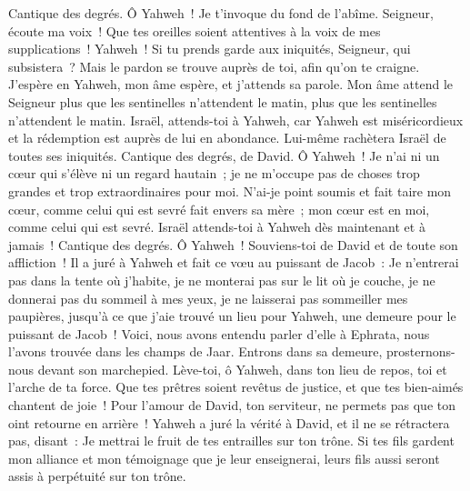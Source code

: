 \begin{multicols}{2}
\VerseOne{}Cantique des degrés. Ô Yahweh~! Je t'invoque du fond de l'abîme.
Seigneur, écoute ma voix~! Que tes oreilles soient attentives à la voix de mes supplications~!
Yahweh~! Si tu prends garde aux iniquités, Seigneur, qui subsistera~?
Mais le pardon se trouve auprès de toi, afin qu'on te craigne.
J'espère en Yahweh, mon âme espère, et j'attends sa parole.
Mon âme attend le Seigneur plus que les sentinelles n'attendent le matin, plus que les sentinelles n'attendent le matin.
Israël, attends-toi à Yahweh, car Yahweh est miséricordieux et la rédemption est auprès de lui en abondance.
Lui-même rachètera Israël de toutes ses iniquités.
\VerseOne{}Cantique des degrés, de David. Ô Yahweh~! Je n'ai ni un cœur qui s'élève ni un regard hautain~; je ne m'occupe pas de choses trop grandes et trop extraordinaires pour moi.
N'ai-je point soumis et fait taire mon cœur, comme celui qui est sevré fait envers sa mère~; mon cœur est en moi, comme celui qui est sevré.
Israël attends-toi à Yahweh dès maintenant et à jamais~!
\VerseOne{}Cantique des degrés. Ô Yahweh~! Souviens-toi de David et de toute son affliction~!
Il a juré à Yahweh et fait ce vœu au puissant de Jacob~:
Je n'entrerai pas dans la tente où j'habite, je ne monterai pas sur le lit où je couche,
je ne donnerai pas du sommeil à mes yeux, je ne laisserai pas sommeiller mes paupières,
jusqu'à ce que j'aie trouvé un lieu pour Yahweh, une demeure pour le puissant de Jacob~!
Voici, nous avons entendu parler d'elle à Ephrata, nous l'avons trouvée dans les champs de Jaar.
Entrons dans sa demeure, prosternons-nous devant son marchepied.
Lève-toi, ô Yahweh, dans ton lieu de repos, toi et l'arche de ta force.
Que tes prêtres soient revêtus de justice, et que tes bien-aimés chantent de joie~!
Pour l'amour de David, ton serviteur, ne permets pas que ton oint retourne en arrière~!
Yahweh a juré la vérité à David, et il ne se rétractera pas, disant~: Je mettrai le fruit de tes entrailles sur ton trône.
Si tes fils gardent mon alliance et mon témoignage que je leur enseignerai, leurs fils aussi seront assis à perpétuité sur ton trône.

\end{multicols}
